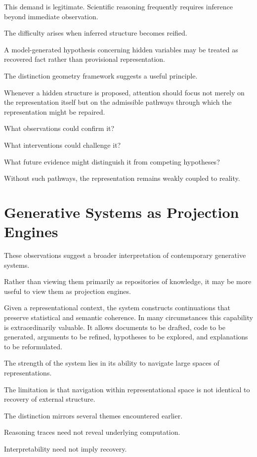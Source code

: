 \documentclass[11pt,oneside,openany]{book}
\begin{document}
This demand is legitimate. Scientific reasoning frequently requires inference beyond immediate observation.

The difficulty arises when inferred structure becomes reified.

A model-generated hypothesis concerning hidden variables may be treated as recovered fact rather than provisional representation.

The distinction geometry framework suggests a useful principle.

Whenever a hidden structure is proposed, attention should focus not merely on the representation itself but on the admissible pathways through which the representation might be repaired.

What observations could confirm it?

What interventions could challenge it?

What future evidence might distinguish it from competing hypotheses?

Without such pathways, the representation remains weakly coupled to reality.

\section{Generative Systems as Projection Engines}

These observations suggest a broader interpretation of contemporary generative systems.

Rather than viewing them primarily as repositories of knowledge, it may be more useful to view them as projection engines.

Given a representational context, the system constructs continuations that preserve statistical and semantic coherence. In many circumstances this capability is extraordinarily valuable. It allows documents to be drafted, code to be generated, arguments to be refined, hypotheses to be explored, and explanations to be reformulated.

The strength of the system lies in its ability to navigate large spaces of representations.

The limitation is that navigation within representational space is not identical to recovery of external structure.

The distinction mirrors several themes encountered earlier.

Reasoning traces need not reveal underlying computation.

Interpretability need not imply recovery.
\end{document}

